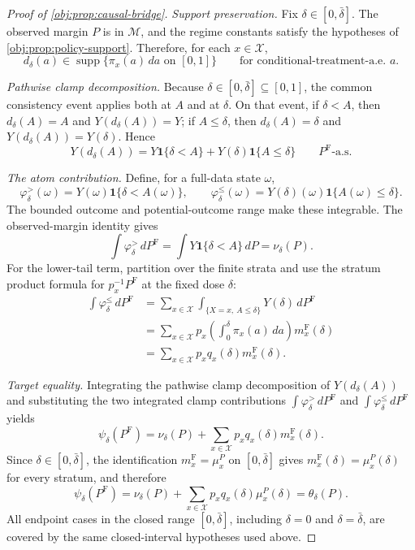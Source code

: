 \documentclass[11pt]{article}
\begin{document}
\begin{proof}[Proof of \cref{obj:prop:causal-bridge}]
\emph{Support preservation.}
Fix \(\delta\in[0,\bar\delta]\).  The observed margin \(P\) is in
\(\mathcal M\), and the regime constants satisfy the hypotheses of
\cref{obj:prop:policy-support}.  Therefore, for each \(x\in\mathcal X\),
\[
d_\delta(a)\in
\operatorname{supp}\{\pi_x(a)\,da\text{ on }[0,1]\}
\qquad
\text{for conditional-treatment-a.e. }a .
\] %

\emph{Pathwise clamp decomposition.}
Because \(\delta\in[0,\bar\delta]\subseteq[0,1]\), the common consistency event
applies both at \(A\) and at \(\delta\).  On that event, if \(\delta<A\), then
\(d_\delta(A)=A\) and \(Y(d_\delta(A))=Y\); if \(A\le\delta\), then
\(d_\delta(A)=\delta\) and \(Y(d_\delta(A))=Y(\delta)\).  Hence
\[
Y(d_\delta(A))
=
Y\mathbf 1\{\delta<A\}
+
Y(\delta)\mathbf 1\{A\le\delta\}
\qquad P^{\mathrm F}\text{-a.s.}
\] %

\emph{The atom contribution.}
Define, for a full-data state \(\omega\),
\[
\varphi_\delta^{> }(\omega)
=
Y(\omega)\mathbf 1\{\delta<A(\omega)\},
\qquad
\varphi_\delta^{\le }(\omega)
=
Y(\delta)(\omega)\mathbf 1\{A(\omega)\le\delta\}.
\]
The bounded outcome and potential-outcome range make these integrable.  The
observed-margin identity gives
\[
\int \varphi_\delta^{>}\,dP^{\mathrm F}
=
\int Y\mathbf 1\{\delta<A\}\,dP
=
\nu_\delta(P).
\]
For the lower-tail term, partition over the finite strata and use the stratum
product formula for \(p_x^{-1}P^{\mathrm F}\) at the fixed dose \(\delta\):
\[
\begin{aligned}
\int \varphi_\delta^{\le}\,dP^{\mathrm F}
&=
\sum_{x\in\mathcal X}
\int_{\{X=x,\ A\le\delta\}}Y(\delta)\,dP^{\mathrm F}  \\
&=
\sum_{x\in\mathcal X}
p_x\left(\int_0^\delta \pi_x(a)\,da\right)m_x^{\mathrm F}(\delta) \\
&=
\sum_{x\in\mathcal X}p_xq_x(\delta)m_x^{\mathrm F}(\delta).
\end{aligned}
\] %

\emph{Target equality.}
Integrating the pathwise clamp decomposition of \(Y(d_\delta(A))\) and substituting
the two integrated clamp contributions \(\int\varphi_\delta^{>}\,dP^{\mathrm F}\) and
\(\int\varphi_\delta^{\le}\,dP^{\mathrm F}\) yields
\[
\psi_\delta(P^{\mathrm F})
=
\nu_\delta(P)+
\sum_{x\in\mathcal X}p_xq_x(\delta)m_x^{\mathrm F}(\delta).
\]
Since \(\delta\in[0,\bar\delta]\), the identification
\(m_x^{\mathrm F}=\mu_x^P\) on \([0,\bar\delta]\) gives
\(m_x^{\mathrm F}(\delta)=\mu_x^P(\delta)\) for every stratum, and therefore
\[
\psi_\delta(P^{\mathrm F})
=
\nu_\delta(P)+
\sum_{x\in\mathcal X}p_xq_x(\delta)\mu_x^P(\delta)
=
\theta_\delta(P).
\]
All endpoint cases in the closed range \([0,\bar\delta]\), including
\(\delta=0\) and \(\delta=\bar\delta\), are covered by the same closed-interval
hypotheses used above. %
\end{proof}
\end{document}
